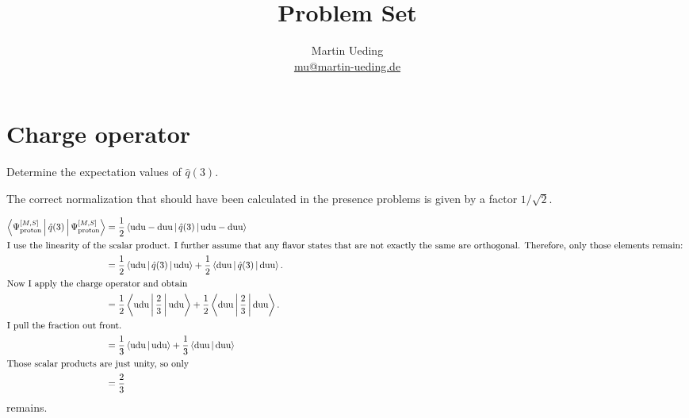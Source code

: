 \documentclass[11pt, english, fleqn, DIV=15, headinclude, BCOR=1cm]{scrartcl}
\title{Problem Set \arabic{problemset}}
\author{
    Martin Ueding \\ \small{\href{mailto:mu@martin-ueding.de}{mu@martin-ueding.de}}
}
\begin{document}
\maketitle

\section{Charge operator}

\begin{problem}
    Determine the expectation values of $\hat q(3)$.
\end{problem}

The correct normalization that should have been calculated in the presence
problems is given by a factor $1/\sqrt 2$.

\newcommand\Pp[1]{\Psi_\text{proton}^{[M,#1]}}

\begin{align*}
    \Braket{\Pp S | \hat q(3) | \Pp S}
    &= \frac 12 \Braket{\text{udu} - \text{duu} | \hat q(3) | \text{udu} - \text{duu}} \\
    \intertext{%
        I use the linearity of the scalar product. I further assume that any
        flavor states that are not exactly the same are orthogonal. Therefore,
        only those elements remain:
    }
    &= \frac 12 \Braket{\text{udu} | \hat q(3) | \text{udu}}
    + \frac 12 \Braket{\text{duu} | \hat q(3) | \text{duu}}. \\
    \intertext{%
        Now I apply the charge operator and obtain
    }
    &= \frac 12 \Braket{\text{udu} | \frac 23 | \text{udu}}
    + \frac 12 \Braket{\text{duu} | \frac 23 | \text{duu}}. \\
    \intertext{%
        I pull the fraction out front.
    }
    &= \frac 13 \Braket{\text{udu} | \text{udu}}
    + \frac 13 \Braket{\text{duu} | \text{duu}} \\
    \intertext{%
        Those scalar products are just unity, so only
    }
    &= \frac 23
\end{align*}
remains.
\end{document}
